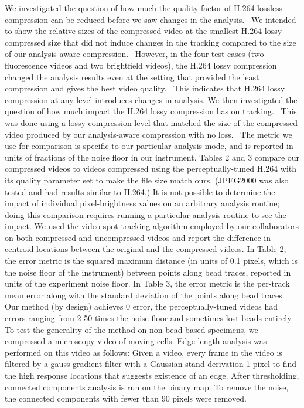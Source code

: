 We investigated the question of how much the quality factor of H.264 lossless compression can be reduced before we saw changes in the analysis.  We intended to show the relative sizes of the compressed video at the smallest H.264 lossy-compressed size that did not induce changes in the tracking compared to the size of our analysis-aware compression.  However, in the four test cases (two fluorescence videos and two brightfield videos), the H.264 lossy compression changed the analysis results even at the setting that provided the least compression and gives the best video quality.  This indicates that H.264 lossy compression at any level introduces changes in analysis.
We then investigated the question of how much impact the H.264 lossy compression has on tracking.  This was done using a lossy compression level that matched the size of the compressed video produced by our analysis-aware compression with no loss.  The metric we use for comparison is specific to our particular analysis mode, and is reported in units of fractions of the noise floor in our instrument.
Tables 2 and 3 compare our compressed videos to videos compressed using the perceptually-tuned H.264 with its quality parameter set to make the file size match ours.  (JPEG2000 was also tested and had results similar to H.264.)  It is not possible to determine the impact of individual pixel-brightness values on an arbitrary analysis routine; doing this comparison requires running a particular analysis routine to see the impact.  We used the video spot-tracking algorithm employed by our collaborators on both compressed and uncompressed videos and report the difference in centroid locations between the original and the compressed videos.  In Table 2, the error metric is the squared maximum distance (in units of 0.1 pixels, which is the noise floor of the instrument) between points along bead traces, reported in units of the experiment noise floor. In Table 3, the error metric is the per-track mean error along with the standard deviation of the points along bead traces.  Our method (by design) achieves 0 error, the perceptually-tuned videos had errors ranging from 2-50 times the noise floor and sometimes lost beads entirely.
To test the generality of the method on non-bead-based specimens, we compressed a microscopy video of moving cells.  Edge-length analysis was performed on this video as follows: Given a video, every frame in the video is filtered by a gauss gradient filter with a Gaussian stand derivation 1 pixel to find the high response locations that suggests existence of an edge. After thresholding, connected components analysis is run on the binary map. To remove the noise, the connected components with fewer than 90 pixels were removed.

